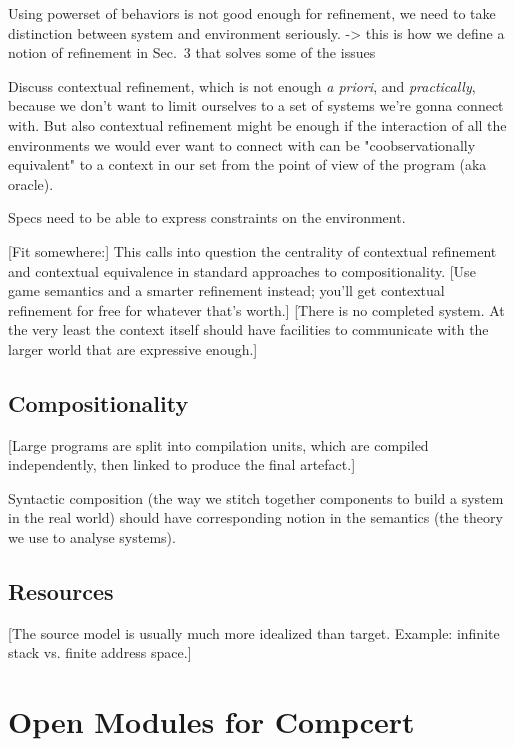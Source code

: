 \documentclass[acmsmall,10pt,review,anonymous]{acmart}
\begin{document}
Using powerset of behaviors is not good enough for refinement,
we need to take distinction between system and environment seriously.
-> this is how we define a notion of refinement in Sec.~3
that solves some of the issues

Discuss contextual refinement,
which is not enough \emph{a priori}, and \emph{practically},
because we don't want to limit ourselves to a set of systems we're gonna connect with.
But also contextual refinement might be enough
if the interaction of all the environments we would ever want to connect with
can be "coobservationally equivalent" to a context in our set
from the point of view of the program (aka oracle).

Specs need to be able to express constraints on the environment.

[Fit somewhere:]
This calls into question
the centrality of contextual refinement and contextual equivalence
in standard approaches to compositionality.
[Use game semantics and a smarter refinement instead;
you'll get contextual refinement for free
for whatever that's worth.]
[There is no completed system.
At the very least the context itself
should have facilities to communicate with the larger world
that are expressive enough.]


\subsection{Compositionality} %

[Large programs are split into compilation units,
which are compiled independently,
then linked to produce the final artefact.]

Syntactic composition
(the way we stitch together components to build a system in the real world)
should have corresponding notion
in the semantics
(the theory we use to analyse systems).


\subsection{Resources} %

[The source model is usually much more idealized than target.
Example: infinite stack vs. finite address space.]



\section{Open Modules for Compcert} %
\end{document}
